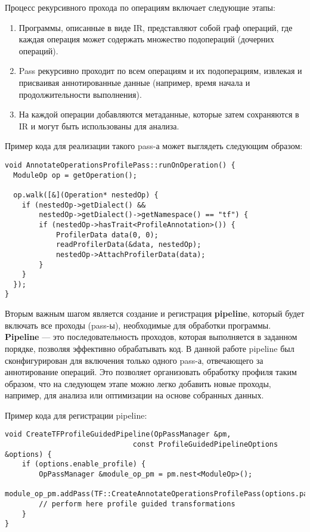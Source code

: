 Процесс рекурсивного прохода по операциям включает следующие этапы:

\begin{enumerate}
    \item Программы, описанные в виде IR, представляют собой граф операций, где каждая операция может содержать множество подопераций (дочерних операций).
    \item Pass рекурсивно проходит по всем операциям и их подоперациям, извлекая и присваивая аннотированные данные (например, время начала и продолжительности выполнения).
    \item На каждой операции добавляются метаданные, которые затем сохраняются в IR и могут быть использованы для анализа.
\end{enumerate}

Пример кода для реализации такого pass-а может выглядеть следующим образом:

\newpage

\begin{lstlisting}[caption={Проход аннотирования операций}]
void AnnotateOperationsProfilePass::runOnOperation() {
  ModuleOp op = getOperation();

  op.walk([&](Operation* nestedOp) {
    if (nestedOp->getDialect() &&
        nestedOp->getDialect()->getNamespace() == "tf") {
        if (nestedOp->hasTrait<ProfileAnnotation>()) {
            ProfilerData data(0, 0);
            readProfilerData(&data, nestedOp);
            nestedOp->AttachProfilerData(data);
        }
    }
  });
}
\end{lstlisting}


Вторым важным шагом является создание и регистрация \textbf{pipeline}, который будет включать все проходы (pass-ы), необходимые для обработки программы.
\textbf{Pipeline} — это последовательность проходов, которая выполняется в заданном порядке, позволяя эффективно обрабатывать код.
В данной работе pipeline был сконфигурирован для включения только одного pass-а, отвечающего за аннотирование операций.
Это позволяет организовать обработку профиля таким образом, что на следующем этапе можно легко добавить новые проходы, например, для анализа или оптимизации на основе собранных данных.

Пример кода для регистрации pipeline:

\begin{lstlisting}[caption={Регистрация PGO pipeline-а}]
void CreateTFProfileGuidedPipeline(OpPassManager &pm,
                              const ProfileGuidedPipelineOptions &options) {
    if (options.enable_profile) {
        OpPassManager &module_op_pm = pm.nest<ModuleOp>();
        module_op_pm.addPass(TF::CreateAnnotateOperationsProfilePass(options.path_to_profile));
        // perform here profile guided transformations
    }
}
\end{lstlisting}


